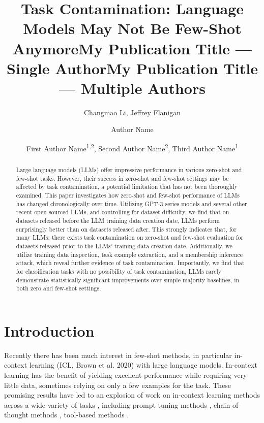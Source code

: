 \documentclass[letterpaper]{article} %
\title{Task Contamination: Language Models May Not Be Few-Shot Anymore}
\author {
    Changmao Li, 
    Jeffrey Flanigan
}
\title{My Publication Title --- Single Author}
\author {
    Author Name
}
\title{My Publication Title --- Multiple Authors}
\author {
    First Author Name\textsuperscript{\rm 1,\rm 2},
    Second Author Name\textsuperscript{\rm 2},
    Third Author Name\textsuperscript{\rm 1}
}
\newcommand{\nilay}[1]{}
\newcommand{\jmf}[1]{}      %
\begin{document}
\maketitle


\begin{abstract}
Large language models (LLMs) offer impressive performance in various zero-shot and few-shot tasks. However, their success in zero-shot and few-shot settings may be affected by task contamination, a potential limitation that has not been thoroughly examined. This paper investigates how zero-shot and few-shot performance of LLMs has changed chronologically over time. Utilizing GPT-3 series models and several other recent open-sourced LLMs, and controlling for dataset difficulty, we find that on datasets released before the LLM training data creation date, LLMs perform surprisingly better than on datasets released after. This strongly indicates that, for many LLMs, there exists task contamination on zero-shot and few-shot evaluation for datasets released prior to the LLMs' training data creation date. Additionally, we utilize training data inspection, task example extraction, and a membership inference attack, which reveal further evidence of task contamination. Importantly, we find that for classification tasks with no possibility of task contamination, LLMs rarely demonstrate statistically significant improvements over simple majority baselines, in both zero and few-shot settings.
\end{abstract}


\section{Introduction}

Recently there has been much interest in few-shot methods, in particular in-context learning (ICL, Brown et al. 2020) with large language models.  In-context learning has the benefit of yielding excellent performance while requiring very little data, sometimes relying on only a few examples for the task\nilay{maybe change 'few' to '< 10' to give concrete number?}.  These promising results have led to an explosion of work on in-context learning methods across a wide variety of tasks \cite{schick-schutze-2021a, schick-schutze-2021b, poesia2022, hu-etal-2022},\jmf{shorten to just the highlights, 3-4 citations} including prompt tuning methods \cite{qin2021, lester2021}, chain-of-thought methods \cite{wei2022, wang2022, wang2023, aiyappa2023}, tool-based methods \cite{Timo2023, yang2023}.
\end{document}
